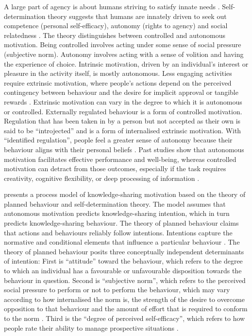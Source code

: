 A large part of agency is about humans striving to satisfy innate needs \citep{deci2001need}. Self-determination theory suggests that humans are innately driven to seek out competence (personal self-efficacy), autonomy (rights to agency) and social relatedness \citep{ryan2000self}. The theory distinguishes between controlled and autonomous motivation. Being controlled involves acting under some sense of social pressure (subjective norm). Autonomy involves acting with a sense of volition and having the experience of choice. Intrinsic motivation, driven by an individual's interest or pleasure in the activity itself, is mostly autonomous. Less engaging activities require extrinsic motivation, where people's actions depend on the perceived contingency between behaviour and the desire for implicit approval or tangible rewards \citep{gagne2005self}. Extrinsic motivation can vary in the degree to which it is autonomous or controlled. Externally regulated behaviour is a form of controlled motivation. Regulation that has been taken in by a person but not accepted as their own is said to be \enquote{introjected} and is a form of internalised extrinsic motivation. With \enquote{identified regulation}, people feel a greater sense of autonomy because their behaviour aligns with their personal beliefs \citep{gagne2005self}. Past studies show that autonomous motivation facilitates effective performance and well-being, whereas controlled motivation can detract from those outcomes, especially if the task requires creativity, cognitive flexibility, or deep processing of information \citep{gagne2005self}. \medskip

\citet{gagne2009model} presents a process model of knowledge-sharing motivation based on the theory of planned behaviour and self-determination theory. The model assumes that autonomous motivation predicts knowledge-sharing intention, which in turn predicts knowledge-sharing behaviour. The theory of planned behaviour claims that actions and behaviours reliably follow intentions. Intentions capture the normative and conditional elements that influence a particular behaviour \citep{ajzen1985intentions,nguyen2020review}. The theory of planned behaviour posits three conceptually independent determinants of intention: First is \enquote{attitude} toward the behaviour, which refers to the degree to which an individual has a favourable or unfavourable disposition towards the behaviour in question. Second is \enquote{subjective norm}, which refers to the perceived social pressure to perform or not to perform the behaviour, which may vary according to how internalised the norm is, the strength of the desire to overcome opposition to that behaviour and the amount of effort that is required to conform to the norm \citep{loyal2001agency}. Third is the \enquote{degree of perceived self-efficacy}, which refers to how people rate their ability to manage prospective situations \citep{white1959motivation, bandura1982self,ajzen1991theory}. \medskip

